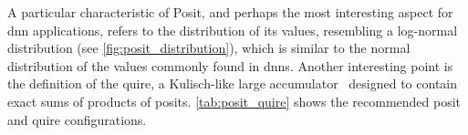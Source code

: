\documentclass{article}
\begin{document}
	A particular characteristic of Posit, and perhaps the most interesting aspect for \acrshort{dnn} applications, refers to the distribution of its values, resembling a log-normal distribution (see \cref{fig:posit_distribution}), which is similar to the normal distribution of the values commonly found in \glspl{dnn}.
	Another interesting point is the definition of the quire, a Kulisch-like large accumulator~\cite{Kulisch2012} designed to contain exact sums of products of posits. \cref{tab:posit_quire} shows the recommended posit and quire configurations.
	
	
	
	
	
	
	
\end{document}
